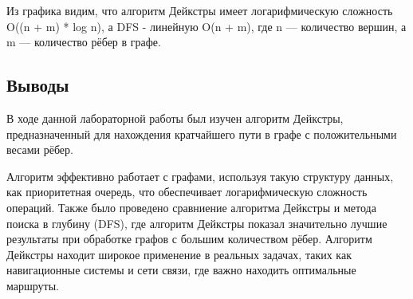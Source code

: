 \documentclass[12pt]{article}
\begin{document}
Из графика видим, что алгоритм Дейкстры имеет логарифмическую сложность O((n + m) * log n), а DFS - линейную O(n + m), где n — количество вершин, а m — количество рёбер в графе.


\subsection*{Выводы}

В ходе данной лабораторной работы был изучен алгоритм Дейкстры, предназначенный для нахождения кратчайшего пути в графе с положительными весами рёбер. 

Алгоритм эффективно работает с графами, используя такую структуру данных, как приоритетная очередь, что обеспечивает логарифмическую сложность операций. Также было проведено сравниение алгоритма Дейкстры и метода поиска в глубину (DFS), где алгоритм Дейкстры показал значительно лучшие результаты при обработке графов с большим количеством рёбер. Алгоритм Дейкстры находит широкое применение в реальных задачах, таких как навигационные системы и сети связи, где важно находить оптимальные маршруты.
\end{document}
